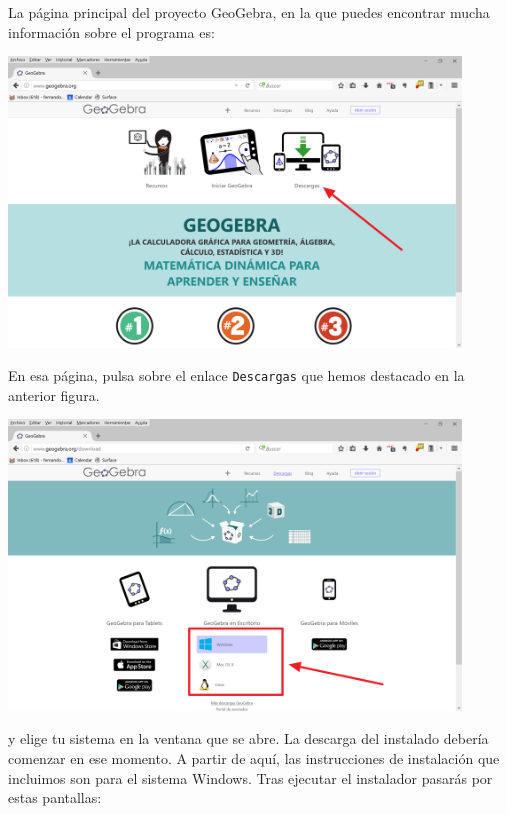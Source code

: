 \documentclass[10pt,a4paper]{article}\usepackage[]{graphicx}\usepackage[]{color}
\newcounter {cont01}
\begin{document}
La página principal del proyecto GeoGebra, en la que puedes encontrar mucha información sobre el
programa es:
\begin{center}
\end{center}
    \begin{center}
    \includegraphics[width=12cm]{../fig/Tut00-GeoGebraDescarga01-201605.png}
    \end{center}
En esa página, pulsa sobre el enlace {\tt Descargas} que hemos destacado en la anterior
figura.
    \begin{center}
    \includegraphics[width=12cm]{../fig/Tut00-GeoGebraDescarga02-201605.png}
    \end{center}
y elige tu sistema en la ventana que se abre. La descarga del instalado debería comenzar en ese
momento. A partir de aquí, las instrucciones de instalación que incluimos son para el sistema
Windows. Tras ejecutar el instalador pasarás por estas pantallas:
\end{document}
